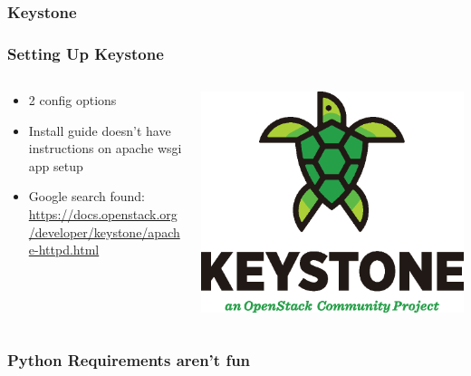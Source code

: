 \documentclass[aspectratio=169,11pt,hyperref={colorlinks=true}]{beamer}
\begin{document}
\subsubsection{Keystone}
\begin{frame}
    \frametitle{Setting Up Keystone}
    \begin{columns}[T]
        \begin{column}{.48\textwidth}
            \begin{itemize}
                \item 2 config options
                \item Install guide doesn't have instructions on
                    apache wsgi app setup
                \item Google search found: \href{https://docs.openstack.org/developer/keystone/apache-httpd.html}{https://docs.openstack.org/developer/keystone/apache-httpd.html}
            \end{itemize}
        \end{column}
        \begin{column}{.48\textwidth}
            \includegraphics[width=\textwidth]{mascots/keystone.eps}
        \end{column}
    \end{columns}
\end{frame}

\begin{frame}
    \frametitle{Python Requirements aren't fun}
    
\end{frame}
\end{document}
